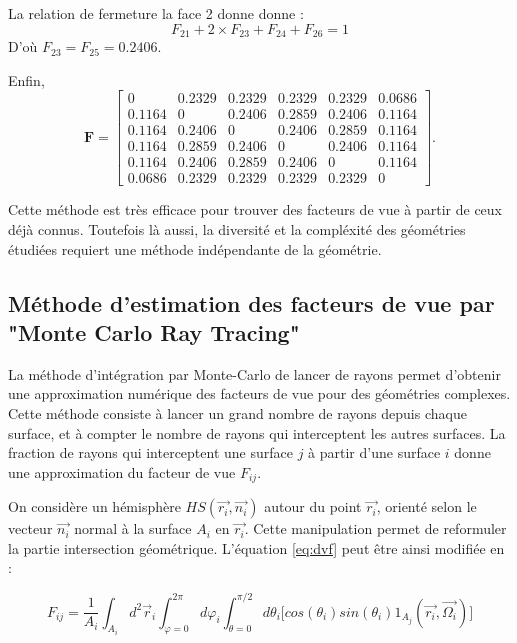 La relation de fermeture la face 2 donne donne :
\begin{equation}
F_{21} + 2\times  F_{23} + F_{24} + F_{26} = 1
\end{equation}
D'où $F_{23} = F_{25} = 0.2406$.

Enfin,
\[
\mathbf{F}=
\begin{bmatrix}
0      & 0.2329 & 0.2329 & 0.2329 & 0.2329 & 0.0686 \\
0.1164 & 0      & 0.2406 & 0.2859 & 0.2406 & 0.1164 \\
0.1164 & 0.2406 & 0      & 0.2406 & 0.2859 & 0.1164 \\
0.1164 & 0.2859 & 0.2406 & 0      & 0.2406 & 0.1164 \\
0.1164 & 0.2406 & 0.2859 & 0.2406 & 0      & 0.1164 \\
0.0686 & 0.2329 & 0.2329 & 0.2329 & 0.2329 & 0
\end{bmatrix}.
\]

Cette méthode est très efficace pour trouver des facteurs de vue à partir de ceux déjà connus. Toutefois là aussi, la diversité et la compléxité des géométries étudiées requiert une méthode indépendante de la géométrie.


\subsection{Méthode d'estimation des facteurs de vue par "Monte Carlo Ray Tracing"}
La méthode d'intégration par Monte-Carlo de lancer de rayons permet d'obtenir une approximation numérique des facteurs de vue pour des géométries complexes. Cette méthode consiste à lancer un grand nombre de rayons depuis chaque surface, et à compter le nombre de rayons qui interceptent les autres surfaces. La fraction de rayons qui interceptent une surface $j$ à partir d'une surface $i$ donne une approximation du facteur de vue $F_{ij}$.

On considère un hémisphère $HS(\vec{r_i}, \vec{n_i})$ autour du point $\vec{r_i}$, orienté selon le vecteur $\vec{n_i}$ normal à la surface $A_i$ en $\vec{r_i}$. Cette manipulation permet de reformuler la partie intersection géométrique. L'équation \ref{eq:dvf} peut être ainsi modifiée en  :

\begin{equation}
    \label{fv}
    F_{ij} = \frac{1}{A_i} \int_{A_i} d^2\vec{r}_i \int_{\varphi = 0}^{2\pi} d\varphi_i \int_{\theta = 0}^{\pi/2} d\theta_i \bigg[cos(\theta_i) sin(\theta_i) 1_{A_j}(\vec{r_i}, \vec{\Omega_i})\bigg]
\end{equation}

